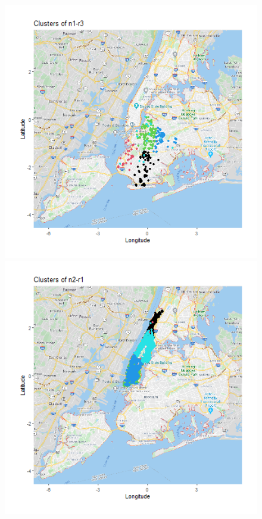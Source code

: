 \documentclass{FR16}
\begin{document}
\begin{figure}[!htb]
\begin{minipage}{0.33\textwidth}
   \end{minipage}
   \begin{minipage}{0.33\textwidth}
     \centering
     \includegraphics[width=1\linewidth]{figures/clust-n1-r3.png} 
   \end{minipage}\hfill
   \begin{minipage}{0.33\textwidth}
     \centering
     \includegraphics[width=1\linewidth]{figures/clust-n2-r1.png}

\end{minipage}
\end{figure}
\end{document}
